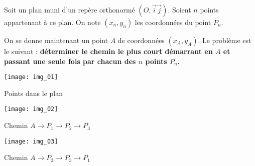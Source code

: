 
\ifprof
\else

Soit un plan muni d'un repère orthonormé $\left(O,\overrightarrow{i}\overrightarrow{j}\right)$. Soient $n$ points appartenant à ce plan. 
On note $(x_n,y_n)$ les coordonnées du point $P_n$. 

On se donne maintenant un point $A$ de coordonnées $(x_A,y_A)$. Le problème est le suivant : \textbf{déterminer le chemin le plus court démarrant en $A$ et passant une seule fois par chacun des $n$ points $P_n$.}

\begin{multicols}{3}
\begin{center}
\texttt{[image: img\_01]}

Points dans le plan
\end{center}

\begin{center}
\texttt{[image: img\_02]}

Chemin $A\to P_1 \to P_2 \to P_3$
\end{center}

\begin{center}
\texttt{[image: img\_03]}

Chemin $A\to P_2 \to P_3 \to P_1$
\end{center}
\end{multicols}
\fi

%
%
%


